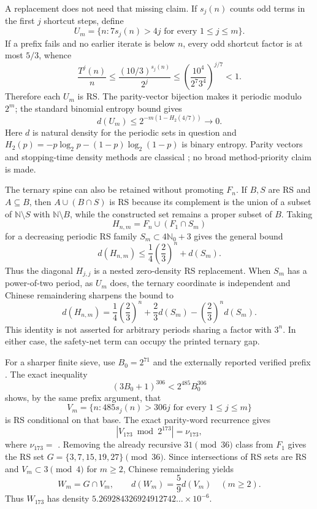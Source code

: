 \documentclass[11pt,a4paper]{article}
\theoremstyle{definition}
\theoremstyle{plain}
\theoremstyle{remark}
\begin{document}
A replacement does not need that missing claim.  If \(s_j(n)\) counts odd
terms in the first \(j\) shortcut steps, define
\[
 U_m=\{n:7s_j(n)>4j\text{ for every }1\le j\le m\}.
\]
If a prefix fails and no earlier iterate is below \(n\), every odd shortcut
factor is at most \(5/3\), whence
\[
 \frac{T^j(n)}n\le
 \frac{(10/3)^{s_j(n)}}{2^j}
 \le
 \left(\frac{10^4}{2^7 3^4}\right)^{j/7}<1.
\]
Therefore each \(U_m\) is RS.  The parity-vector bijection makes it periodic
modulo \(2^m\); the standard binomial entropy bound gives
\[
 d(U_m)\le2^{-m(1-H_2(4/7))}\longrightarrow0.
\]
Here \(d\) is natural density for the periodic sets in question and
\(H_2(p)=-p\log_2p-(1-p)\log_2(1-p)\) is binary entropy.
Parity vectors and stopping-time density methods are classical
\citep{terras1976stopping,lagarias1985three,monks2013sufficient,
rozier2026paradoxical}; no broad method-priority claim is made.

The ternary spine can also be retained without promoting \(F_n\).  If \(B,S\)
are RS and \(A\subseteq B\), then \(A\cup(B\cap S)\) is RS because its
complement is the union of a subset of \(\mathbb N\setminus S\) with
\(\mathbb N\setminus B\), while the constructed set remains a proper subset
of \(B\).  Taking
\[
 H_{n,m}=F_n\cup(F_1\cap S_m)
\]
for a decreasing periodic RS family \(S_m\subset4\mathbb N_0+3\) gives the
general bound
\[
 d(H_{n,m})\le
 \frac14\left(\frac23\right)^n+d(S_m).
\]
Thus the diagonal \(H_{j,j}\) is a nested zero-density RS replacement.  When
\(S_m\) has a power-of-two period, as \(U_m\) does, the ternary coordinate is
independent and Chinese remaindering sharpens the bound to
\[
 d(H_{n,m})=
 \frac14\left(\frac23\right)^n+\frac23d(S_m)
 -\left(\frac23\right)^n d(S_m).
\]
This identity is not asserted for arbitrary periods sharing a factor with
\(3^n\).  In either case, the safety-net term can occupy the printed ternary
gap.

For a sharper finite sieve, use \(B_0=2^{71}\) and the externally reported
verified prefix \citep{barina2025verification}.  The exact inequality
\[
 (3B_0+1)^{306}<2^{485}B_0^{306}
\]
shows, by the same prefix argument, that
\[
 V_m=\{n:485s_j(n)>306j\text{ for every }1\le j\le m\}
\]
is RS conditional on that base.  The exact parity-word recurrence gives
\[
 |V_{173}\bmod2^{173}|=\nu_{173},
\]
where
\(\nu_{173}=\)
\texttt{}.
Removing the already recursive \(31\pmod {36}\) class from \(F_1\) gives the
RS set \(G=\{3,7,15,19,27\}\pmod {36}\).  Since intersections of RS sets are
RS and \(V_m\subset3\pmod4\) for \(m\ge2\), Chinese remaindering yields
\[
 W_m=G\cap V_m,\qquad d(W_m)=\frac59d(V_m)
 \quad(m\ge2).
\]
Thus \(W_{173}\) has density
\(5.269284326924912742\ldots\times10^{-6}\).
\end{document}
